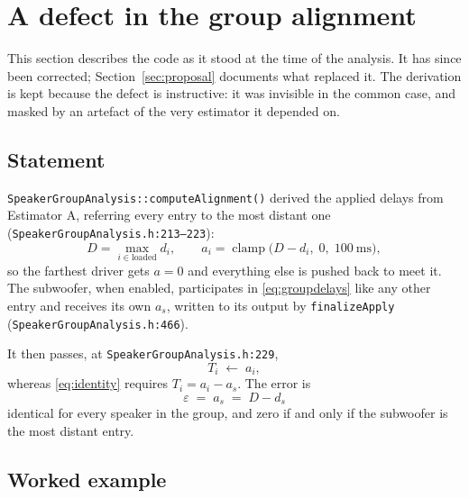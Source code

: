 \documentclass[11pt,a4paper]{article}
\newcommand{\srcref}[2]{\texttt{\small #1}\discretionary{}{}{}\texttt{\small :#2}}
\newcommand{\code}[1]{\texttt{\small #1}}
\begin{document}
\section{A defect in the group alignment}
\label{sec:defect}

This section describes the code as it stood at the time of the analysis. It has
since been corrected; Section~\ref{sec:proposal} documents what replaced it. The
derivation is kept because the defect is instructive: it was invisible in the
common case, and masked by an artefact of the very estimator it depended on.

\subsection{Statement}

\code{SpeakerGroupAnalysis::computeAlignment()} derived the applied delays from
Estimator A, referring every entry to the most distant one
(\srcref{SpeakerGroupAnalysis.h}{213--223}):
%
\begin{equation}
  D = \max_{i \in \text{loaded}} d_i,
  \qquad
  a_i = \operatorname{clamp}\bigl(D - d_i,\; 0,\; \SI{100}{\milli\second}\bigr),
  \label{eq:groupdelays}
\end{equation}
%
so the farthest driver gets $a = 0$ and everything else is pushed back to meet
it. The subwoofer, when enabled, participates in \eqref{eq:groupdelays} like any
other entry and receives its own $a_s$, written to its output by
\code{finalizeApply} (\srcref{SpeakerGroupAnalysis.h}{466}).

It then passes, at \srcref{SpeakerGroupAnalysis.h}{229},
%
\begin{equation}
  T_i \;\leftarrow\; a_i,
\end{equation}
%
whereas \eqref{eq:identity} requires $T_i = a_i - a_s$. The error is
%
\begin{equation}
  \boxed{\;\varepsilon \;=\; a_s \;=\; D - d_s\;}
  \label{eq:error}
\end{equation}
%
identical for every speaker in the group, and zero if and only if the subwoofer
is the most distant entry.

\subsection{Worked example}
\end{document}
